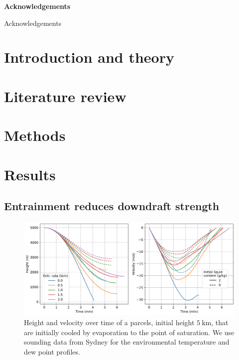 \documentclass[12pt,titlepage]{article}
\begin{document}
\begin{center}
	\large
	\textbf{Acknowledgements}
\end{center}

Acknowledgements

\tableofcontents

\clearpage
\section{Introduction and theory}

\section{Literature review}

\section{Methods}

\section{Results}
\subsection{Entrainment reduces downdraft strength}

\begin{figure}[ht]
	\centering
	\includegraphics[width=0.8\linewidth]
		{figures/20211026_experiments_sydney/entrainment_rate_vs_motion}
	\caption{
		Height and velocity over time of a parcels, initial height
		$\SI{5}{\kilo\meter}$, that are initially cooled by evaporation to
		the point of saturation. We use sounding data from Sydney
		for the environmental temperature and dew point profiles.}
	\label{sydney_entrainment_rate_vs_motion}
\end{figure}
\end{document}
